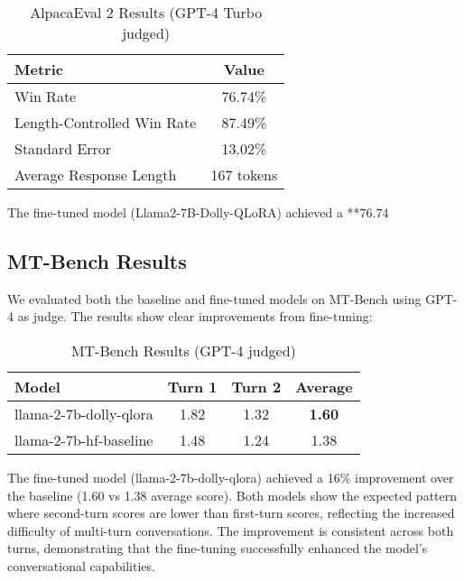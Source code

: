 \documentclass{assignment7_report}
\begin{document}
\begin{table}[h!]
\centering
\caption{AlpacaEval 2 Results (GPT-4 Turbo judged)}
\label{tab:alpaca_eval_results}
\begin{tabular}{@{}lc@{}}
\toprule
\textbf{Metric} & \textbf{Value} \\ \midrule
Win Rate & 76.74\% \\
Length-Controlled Win Rate & 87.49\% \\
Standard Error & 13.02\% \\
Average Response Length & 167 tokens \\ \bottomrule
\end{tabular}
\end{table}

The fine-tuned model (Llama2-7B-Dolly-QLoRA) achieved a **76.74%

\subsection{MT-Bench Results}

We evaluated both the baseline and fine-tuned models on MT-Bench using GPT-4 as judge. The results show clear improvements from fine-tuning:

\begin{table}[h!]
\centering
\caption{MT-Bench Results (GPT-4 judged)}
\label{tab:mt_bench_results}
\begin{tabular}{@{}lccc@{}}
\toprule
\textbf{Model} & \textbf{Turn 1} & \textbf{Turn 2} & \textbf{Average} \\ \midrule
llama-2-7b-dolly-qlora & 1.82 & 1.32 & \textbf{1.60} \\
llama-2-7b-hf-baseline & 1.48 & 1.24 & 1.38 \\ \bottomrule
\end{tabular}
\end{table}

The fine-tuned model (llama-2-7b-dolly-qlora) achieved a 16\% improvement over the baseline (1.60 vs 1.38 average score). Both models show the expected pattern where second-turn scores are lower than first-turn scores, reflecting the increased difficulty of multi-turn conversations. The improvement is consistent across both turns, demonstrating that the fine-tuning successfully enhanced the model's conversational capabilities.
\end{document}
